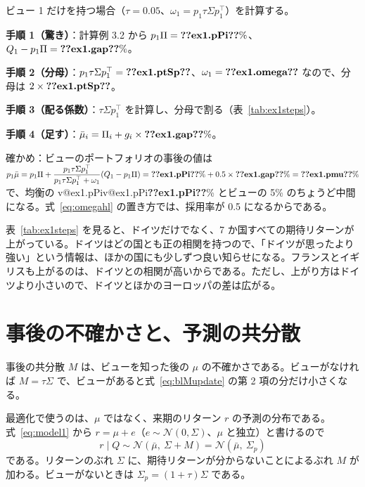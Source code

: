 \documentclass[xelatex,ja=standard,jafont=hiragino-pron,a4paper,11pt,openany]{bxjsreport}
\makeatletter
\newcommand{\V}[1]{\ifcsname v@#1\endcsname\csname v@#1\endcsname\else\textbf{??#1??}\fi}
\newcommand{\tabin}[1]{\adjustbox{max width=\linewidth}{}}
\newcommand{\T}{^{\top}}
\newcommand{\mub}{\bar{\mu}}
\newcommand{\Sp}{\Sigma_{p}}
\newcommand{\tabref}[1]{表~\ref{#1}}
\makeatother
\begin{document}
\begin{exbox}
ビュー 1 だけを持つ場合（$\tau = 0.05$、$\omega_1 = p_1\tau\Sigma p_1\T$）を計算する。

\textbf{手順 1（驚き）}：計算例 3.2 から $p_1\Pi = \V{ex1.pPi}\%$、$Q_1 - p_1\Pi = \V{ex1.gap}\%$。

\textbf{手順 2（分母）}：$p_1\tau\Sigma p_1\T = \V{ex1.ptSp}$、$\omega_1 = \V{ex1.omega}$ なので、分母は $2 \times \V{ex1.ptSp}$。

\textbf{手順 3（配る係数）}：$\tau\Sigma p_1\T$ を計算し、分母で割る（\tabref{tab:ex1steps}）。

\textbf{手順 4（足す）}：$\mub_i = \Pi_i + g_i \times \V{ex1.gap}\%$。

確かめ：ビューのポートフォリオの事後の値は
$p_1\mub = p_1\Pi + \dfrac{p_1\tau\Sigma p_1\T}{p_1\tau\Sigma p_1\T + \omega_1}(Q_1 - p_1\Pi) = \V{ex1.pPi}\% + 0.5 \times \V{ex1.gap}\% = \V{ex1.pmu}\%$ で、均衡の \V{ex1.pPi}\% とビューの 5\% のちょうど中間になる。式~\eqref{eq:omegahl} の置き方では、採用率が 0.5 になるからである。
\end{exbox}

\begin{table}[htbp]
\centering
\caption{例 1 の事後の期待リターンの計算（年率）。$g_i$ は式~\eqref{eq:gain} の係数。}
\label{tab:ex1steps}
\small\tabin{ex1_steps}
\end{table}

\tabref{tab:ex1steps} を見ると、ドイツだけでなく、7 か国すべての期待リターンが上がっている。ドイツはどの国とも正の相関を持つので、「ドイツが思ったより強い」という情報は、ほかの国にも少しずつ良い知らせになる。フランスとイギリスも上がるのは、ドイツとの相関が高いからである。ただし、上がり方はドイツより小さいので、ドイツとほかのヨーロッパの差は広がる。

\section{事後の不確かさと、予測の共分散}

事後の共分散 $M$ は、ビューを知った後の $\mu$ の不確かさである。ビューがなければ $M = \tau\Sigma$ で、ビューがあると式~\eqref{eq:blMupdate} の第 2 項の分だけ小さくなる。

最適化で使うのは、$\mu$ ではなく、来期のリターン $r$ の予測の分布である。式~\eqref{eq:model1} から $r = \mu + e$（$e \sim \mathcal{N}(0, \Sigma)$、$\mu$ と独立）と書けるので
\begin{equation}
r \mid Q \sim \mathcal{N}(\mub,\ \Sigma + M) = \mathcal{N}(\mub,\ \Sp)
\label{eq:predictive}
\end{equation}
である。リターンのぶれ $\Sigma$ に、期待リターンが分からないことによるぶれ $M$ が加わる。ビューがないときは $\Sp = (1 + \tau)\Sigma$ である。
\end{document}
